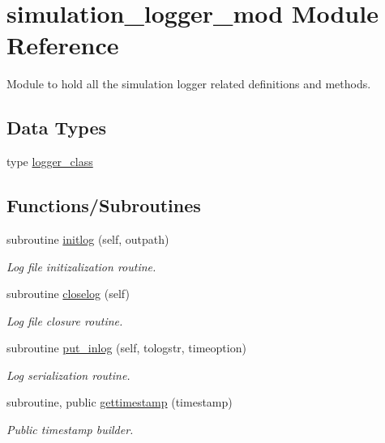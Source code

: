 \hypertarget{namespacesimulation__logger__mod}{}\section{simulation\+\_\+logger\+\_\+mod Module Reference}
\label{namespacesimulation__logger__mod}


Module to hold all the simulation logger related definitions and methods.  


\subsection*{Data Types}
\begin{DoxyCompactItemize}
\item 
type \mbox{\hyperlink{structsimulation__logger__mod_1_1logger__class}{logger\+\_\+class}}
\end{DoxyCompactItemize}
\subsection*{Functions/\+Subroutines}
\begin{DoxyCompactItemize}
\item 
subroutine \mbox{\hyperlink{namespacesimulation__logger__mod_abf603e657da9104a8060ab53c72f0aca}{initlog}} (self, outpath)
\begin{DoxyCompactList}\small\item\em Log file initizalization routine. \end{DoxyCompactList}\item 
subroutine \mbox{\hyperlink{namespacesimulation__logger__mod_aa6d1aaea74403186da0f98afb74ecebe}{closelog}} (self)
\begin{DoxyCompactList}\small\item\em Log file closure routine. \end{DoxyCompactList}\item 
subroutine \mbox{\hyperlink{namespacesimulation__logger__mod_a34980631cfcf2d2172aa3b491acace4c}{put\+\_\+inlog}} (self, tologstr, timeoption)
\begin{DoxyCompactList}\small\item\em Log serialization routine. \end{DoxyCompactList}\item 
subroutine, public \mbox{\hyperlink{namespacesimulation__logger__mod_a0326a5eeb649b041064a01d96aef0989}{gettimestamp}} (timestamp)
\begin{DoxyCompactList}\small\item\em Public timestamp builder. \end{DoxyCompactList}\end{DoxyCompactItemize}
